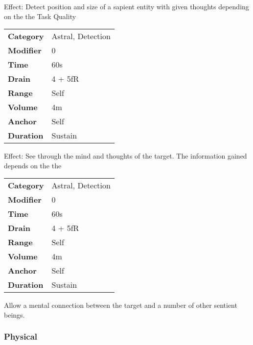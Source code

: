 \hfil

Effect: Detect position and size of a sapient entity with given thoughts
depending on the the Task Quality



\begin{tabular}{ll}
    \textbf{Category} & Astral, Detection \\
    \textbf{Modifier} & 0                 \\
    \textbf{Time}     & 60s               \\
    \textbf{Drain}    & 4 + 5fR           \\
    \textbf{Range}    & Self              \\
    \textbf{Volume}   & 4m                \\
    \textbf{Anchor}   & Self              \\
    \textbf{Duration} & Sustain           \\
\end{tabular}

\hfil

Effect: See through the mind and thoughts of the target. The information
gained depends on the the


\begin{tabular}{ll}
    \textbf{Category} & Astral, Detection \\
    \textbf{Modifier} & 0                 \\
    \textbf{Time}     & 60s               \\
    \textbf{Drain}    & 4 + 5fR           \\
    \textbf{Range}    & Self              \\
    \textbf{Volume}   & 4m                \\
    \textbf{Anchor}   & Self              \\
    \textbf{Duration} & Sustain           \\
\end{tabular}

\hfil

Allow a mental connection between the target and a number of
other sentient beings.

\subsubsection{Physical}


